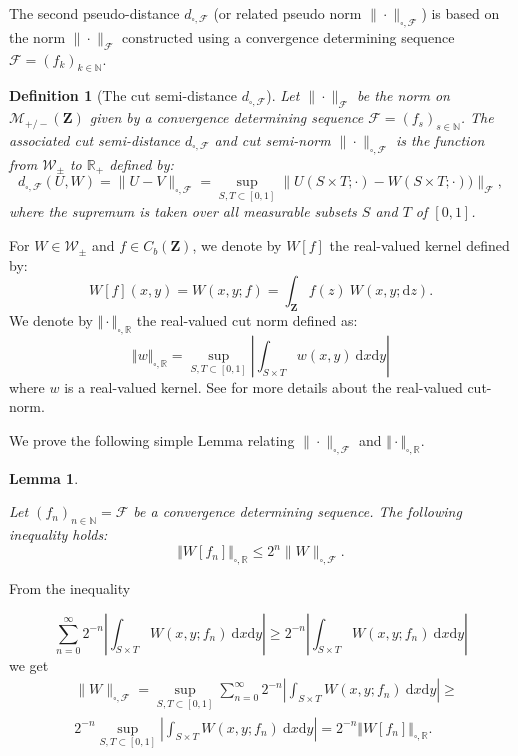 \documentclass[11pt]{article}
\newtheorem{lemma}[theorem]{Lemma}
\newtheorem{definition}[theorem]{Definition}
\def\R{\mathbb{R}}
\def\N{\mathbb{N}}
\newcommand{\cF}{{\mathcal F}}  %
\newcommand{\Space}{\mathbf{Z}}
\newcommand{\signed}{\pm}
\newcommand{\CbFunct}{C_b(\Space)}
\newcommand{\Kernel}{\mathcal{W}_{\signed}}
\newcommand{\NcutR}[1]{\Vert#1\Vert_{\square,\R}}
\newcommand{\NcutRSymbol}{\Vert\cdot\Vert_{\square,\R}}
\newcommand{\drv}{\mathrm{d}}
\begin{document}
The second pseudo-distance $d_{\square,\cF}$ (or related pseudo norm $\|\cdot\|_{\square,\cF}$) is based on the norm $\|\cdot\|_{\mathcal{F}}$ constructed using a convergence determining sequence $\cF=(f_k)_{k\in\N}$.

\begin{definition}[The cut semi-distance $d_{\square, \mathcal{F}}$]
     Let $\|\cdot\|_{\mathcal{F}}$ be the norm on $\mathcal{M}_{+/-}(\mathbf{Z})$ given by a convergence determining sequence $\cF=(f_s)_{s\in\N}$.  %
     The associated cut semi-distance $d_{\square, \cF}$ and cut semi-norm $\|\cdot\|_{\square,\cF}$ is the function from $\Kernel$ to $\R_{+}$ defined by:
\begin{equation}\label{cutsemi-disteq_cF}
    d_{\square,\cF}(U, W)=\|U-V\|_{\square,\cF}=\sup _{S, T \subset[0,1]} \|U(S \times T ; \cdot)- W(S \times T ; \cdot))\|_{\cF},
\end{equation}
where the supremum is taken over all measurable subsets $S$ and $T$ of $[0,1]$.
\end{definition}
\medskip
For  $W\in\Kernel$ and  $f\in\CbFunct$, we denote by $W[f]$ the real-valued kernel defined by:
\begin{equation}
   \label{eq:notation_graphon_function}
  W[f](x,y) = W(x,y;f) = \int_{\Space} f(z)\ W(x,y;\drv z).
\end{equation}
We denote by $\NcutRSymbol$ the real-valued cut norm defined as:
\begin{equation}
	\label{eq_def_NcutR}
\NcutR{w} = \sup_{S,T \subset [0,1]} \left\vert \int_{S\times T} w(x,y)\ \drv x\drv y \right\vert
\end{equation}
where $w$ is a real-valued kernel. See \cite{LovaszGraphLimits} for more details about the real-valued cut-norm.

We prove the following simple Lemma relating $\|\cdot\|_{\square,\cF}$ and $\NcutRSymbol.$

\begin{lemma}\label{lemmaBoundConvDetSequenceCutNormF}

Let $(f_n)_{n\in \N}=\cF$ be a convergence determining sequence. The following inequality holds:
$$    \NcutR{W[f_n]}\leq 2^n\|W\|_{\square,\cF}.$$
\end{lemma}
\proof

From the inequality 

$$
\sum^\infty_{n=0}2^{-n}\left|\int_{S\times T}W(x,y;f_n)\ \drv x \drv y\right|\geq2^{-n}\left|\int_{S\times T}W(x,y;f_n)\ \drv x \drv y\right|$$
we get
$$\begin{aligned}
&\|W\|_{\square,\cF}=\sup_{S,T\subset[0,1]}\sum^\infty_{n=0}2^{-n}\left|\int_{S\times T}W(x,y;f_n)\ \drv x \drv y\right|\geq \\
& 2^{-n}\sup_{S,T\subset[0,1]}\left|\int_{S\times T}W(x,y;f_n)\ \drv x \drv y\right|=2^{-n}\NcutR{W[f_n]}.\end{aligned}$$
\end{document}
